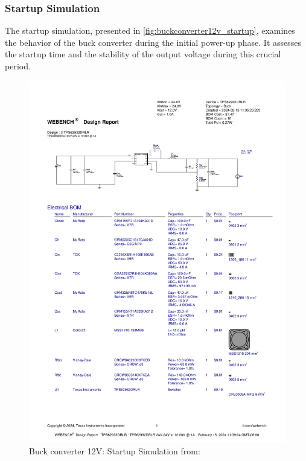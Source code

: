 \subsubsection{Startup Simulation}
The startup simulation, presented in \autoref{fig:buckconverter12v_startup}, examines the behavior of the buck converter during the initial power-up phase. It assesses the startup time and the stability of the output voltage during this crucial period.
\begin{figure}[H]
    \centering
    \includegraphics[trim=0 235 0 70,clip,width=0.8\linewidth,page=8]{img//buckconverters//12v/WBDesign3_Startup.pdf}
    \caption{Buck converter 12V: Startup Simulation from: %
    }
    \label{fig:buckconverter12v_startup}
\end{figure}

